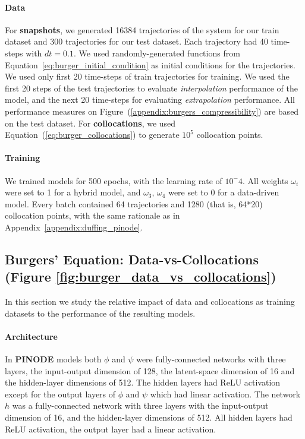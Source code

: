 \paragraph{Data}For \textbf{snapshots}, we generated 16384 trajectories of the system for our train dataset and 300 trajectories for our test dataset. Each trajectory had 40 time-steps with $dt = 0.1$. We used randomly-generated functions from Equation~\ref{eq:burger_initial_condition} as initial conditions for the trajectories. We used only first 20 time-steps of train trajectories for training. We used the first 20 steps of the test trajectories to evaluate \textit{interpolation} performance of the model, and the next 20 time-steps for evaluating \textit{extrapolation} performance. All performance measures on Figure~(\ref{appendix:burgers_compressibility}) are based on the test dataset.
For \textbf{collocations}, we used Equation~(\ref{eq:burger_collocations}) to generate $10^5$ collocation points. 
\paragraph{Training} We trained models for 500 epochs, with the learning rate of $10^-4$. All weights $\omega_i$ were set to 1 for a hybrid model, and $\omega_3$, $\omega_4$ were set to 0 for a data-driven model. Every batch contained 64 trajectories and 1280 (that is, 64*20) collocation points, with the same rationale as in Appendix~\ref{appendix:duffing_pinode}.

\subsection{Burgers' Equation: Data-vs-Collocations (Figure \ref{fig:burger_data_vs_collocations})}
In this section we study the relative impact of data and collocations as training datasets to the performance of the resulting models.
\label{appendix:burgers_data_vs_collocations}
\paragraph{Architecture} In \textbf{PINODE} models both $\phi$ and $\psi$ were fully-connected networks with three layers, the input-output dimension of 128, the latent-space dimension of 16 and the hidden-layer dimensions of 512. The hidden layers had ReLU activation except for the output layers of $\phi$ and $\psi$ which had linear activation. The network $h$ was a fully-connected network with three layers with the input-output dimension of 16, and the hidden-layer dimensions of 512. All hidden layers had ReLU activation, the output layer had a linear activation.

